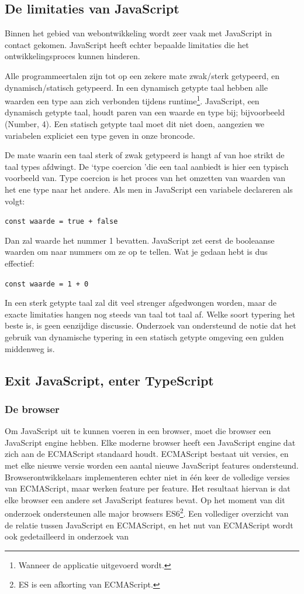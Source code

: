 \subsection{De limitaties van JavaScript}
Binnen het gebied van webontwikkeling wordt zeer vaak met JavaScript in contact gekomen. JavaScript heeft echter bepaalde limitaties die het ontwikkelingsproces kunnen hinderen. \autocite{geeksforgeeks_2021}

Alle programmeertalen zijn tot op een zekere mate zwak/sterk getypeerd, en dynamisch/statisch getypeerd. In een dynamisch getypte taal hebben alle waarden een type aan zich verbonden tijdens runtime\footnote{Wanneer de applicatie uitgevoerd wordt.}. JavaScript, een dynamisch getypte taal, houdt paren van een waarde en type bij; bijvoorbeeld (Number, 4). Een statisch getypte taal moet dit niet doen, aangezien we variabelen expliciet een type geven in onze broncode.

De mate waarin een taal sterk of zwak getypeerd is hangt af van hoe strikt de taal types afdwingt. De \lq type coercion \rq die een taal aanbiedt is hier een typisch voorbeeld van. Type coercion is het proces van het omzetten van waarden van het ene type naar het andere. Als men in JavaScript een variabele declareren als volgt:

\verb|const waarde = true + false|

Dan zal waarde het nummer 1 bevatten. JavaScript zet eerst de booleaanse waarden om naar nummers om ze op te tellen. Wat je gedaan hebt is dus effectief:

\verb|const waarde = 1 + 0|

In een sterk getypte taal zal dit veel strenger afgedwongen worden, maar de exacte limitaties hangen nog steeds van taal tot taal af. Welke soort typering het beste is, is geen eenzijdige discussie. Onderzoek van \textcite{meijer_drayton_2004} ondersteund de notie dat het gebruik van dynamische typering in een statisch getypte omgeving een gulden middenweg is.

\subsection{Exit JavaScript, enter TypeScript}

\subsubsection{De browser}
Om JavaScript uit te kunnen voeren in een browser, moet die browser een JavaScript engine hebben. Elke moderne browser heeft een JavaScript engine dat zich aan de ECMAScript standaard houdt. ECMAScript bestaat uit versies, en met elke nieuwe versie worden een aantal nieuwe JavaScript features ondersteund. Browserontwikkelaars implementeren echter niet in één keer de volledige versies van ECMAScript, maar werken feature per feature. Het resultaat hiervan is dat elke browser een andere set JavaScript features bevat. Op het moment van dit onderzoek ondersteunen alle major browsers ES6\footnote{ES is een afkorting van ECMAScript.}. Een vollediger overzicht van de relatie tussen JavaScript en ECMAScript, en het nut van ECMAScript wordt ook gedetailleerd in onderzoek van \textcite{olund_karlsson_2016}

